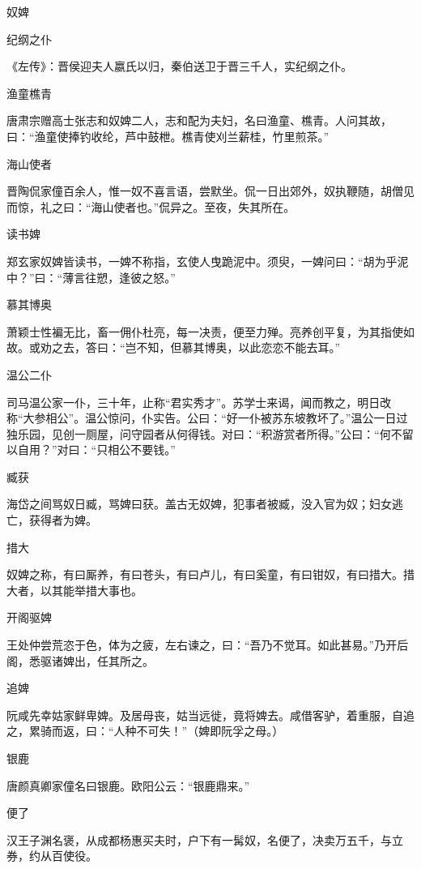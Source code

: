 \documentclass[a4paper,12pt,UTF8,twoside]{ctexbook}
\begin{document}
    奴婢
    
    纪纲之仆
    
    《左传》：晋侯迎夫人嬴氏以归，秦伯送卫于晋三千人，实纪纲之仆。
    
    渔童樵青
    
    唐肃宗赠高士张志和奴婢二人，志和配为夫妇，名曰渔童、樵青。人问其故，曰：“渔童使捧钓收纶，芦中鼓枻。樵青使刈兰薪桂，竹里煎茶。”
    
    海山使者
    
    晋陶侃家僮百余人，惟一奴不喜言语，尝默坐。侃一日出郊外，奴执鞭随，胡僧见而惊，礼之曰：“海山使者也。”侃异之。至夜，失其所在。
    
    读书婢
    
    郑玄家奴婢皆读书，一婢不称指，玄使人曳跪泥中。须臾，一婢问曰：“胡为乎泥中？”曰：“薄言往愬，逢彼之怒。”
    
    慕其博奥
    
    萧颖士性褊无比，畜一佣仆杜亮，每一决责，便至力殚。亮养创平复，为其指使如故。或劝之去，答曰：“岂不知，但慕其博奥，以此恋恋不能去耳。”
    
    温公二仆
    
    司马温公家一仆，三十年，止称“君实秀才”。苏学士来谒，闻而教之，明日改称“大参相公”。温公惊问，仆实告。公曰：“好一仆被苏东坡教坏了。”温公一日过独乐园，见创一厕屋，问守园者从何得钱。对曰：“积游赏者所得。”公曰：“何不留以自用？”对曰：“只相公不要钱。”
    
    臧获
    
    海岱之间骂奴日臧，骂婢曰获。盖古无奴婢，犯事者被臧，没入官为奴；妇女逃亡，获得者为婢。
    
    措大
    
    奴婢之称，有曰厮养，有曰苍头，有曰卢儿，有曰奚童，有曰钳奴，有曰措大。措大者，以其能举措大事也。
    
    开阁驱婢
    
    王处仲尝荒恣于色，体为之疲，左右谏之，曰：“吾乃不觉耳。如此甚易。”乃开后阁，悉驱诸婢出，任其所之。
    
    追婢
    
    阮咸先幸姑家鲜卑婢。及居母丧，姑当远徙，竟将婢去。咸借客驴，着重服，自追之，累骑而返，曰：“人种不可失！”（婢即阮孚之母。）
    
    银鹿
    
    唐颜真卿家僮名曰银鹿。欧阳公云：“银鹿鼎来。”
    
    便了
    
    汉王子渊名褒，从成都杨惠买夫时，户下有一髯奴，名便了，决卖万五千，与立券，约从百使役。
    
\end{document}
